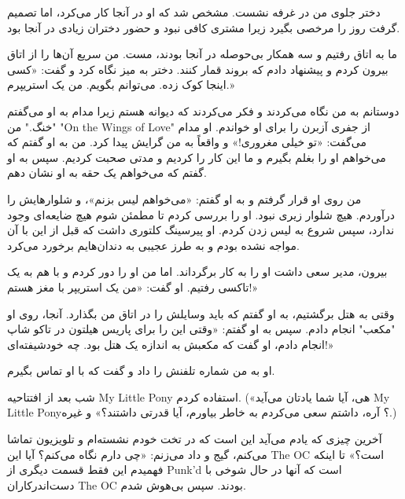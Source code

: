 
دختر جلوی من در غرفه نشست. مشخص شد که او در آنجا کار می‌کرد، اما تصمیم گرفت روز را مرخصی بگیرد زیرا مشتری کافی نبود و حضور دختران زیادی در آنجا بود. 

ما به اتاق رفتیم و سه همکار بی‌حوصله در آنجا بودند، مست. من سریع آن‌ها را از اتاق بیرون کردم و پیشنهاد دادم که بروند قمار کنند. دختر به میز نگاه کرد و گفت: «کسی اینجا کوک زده. می‌توانم بگویم. من یک استریپرم.»

دوستانم به من نگاه می‌کردند و فکر می‌کردند که دیوانه هستم زیرا مدام به او می‌گفتم "خنگ." من "On the Wings of Love" از جفری آزبرن را برای او خواندم. او مدام می‌گفت: «تو خیلی مغروری!» و واقعاً به من گرایش پیدا کرد. من به او گفتم که می‌خواهم او را بغلم بگیرم و ما این کار را کردیم و مدتی صحبت کردیم. سپس به او گفتم که می‌خواهم یک حقه به او نشان دهم.

من روی او قرار گرفتم و به او گفتم: «می‌خواهم لیس بزنم»، و شلوارهایش را درآوردم. هیچ شلوار زیری نبود. او را بررسی کردم تا مطمئن شوم هیچ ضایعه‌ای وجود ندارد، سپس شروع به لیس زدن کردم. او پیرسینگ کلتوری داشت که قبل از این با آن مواجه نشده بودم و به طرز عجیبی به دندان‌هایم برخورد می‌کرد. 

بیرون، مدیر سعی داشت او را به کار برگرداند. اما من او را دور کردم و با هم به یک تاکسی رفتیم. او گفت: «من یک استریپر با مغز هستم!» 

وقتی به هتل برگشتیم، به او گفتم که باید وسایلش را در اتاق من بگذارد. آنجا، روی او "مکعب" انجام دادم. سپس به او گفتم: «وقتی این را برای پاریس هیلتون در تاکو شاپ انجام دادم، او گفت که مکعبش به اندازه یک هتل بود. چه خودشیفته‌ای!» 

او به من شماره تلفنش را داد و گفت که با او تماس بگیرم.

شب بعد از افتتاحیه My Little Pony استفاده کردم. («هی، آیا شما یادتان می‌آید My Little Pony؟ آره، داشتم سعی می‌کردم به خاطر بیاورم، آیا قدرتی داشتند؟» و غیره.) 

آخرین چیزی که یادم می‌آید این است که در تخت خودم نشسته‌ام و تلویزیون تماشا می‌کنم، گیج و داد می‌زنم: «چی دارم نگاه می‌کنم؟ آیا این The OC است؟» تا اینکه فهمیدم این فقط قسمت دیگری از Punk’d است که آنها در حال شوخی با دست‌اندرکاران The OC بودند. سپس بی‌هوش شدم.